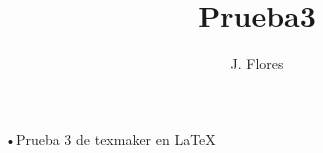 \documentclass[12pt,a4paper]{article}
\author{J. Flores}
\title{Prueba3}
\begin{document}
•Prueba 3 de texmaker en \LaTeX
\end{document}
